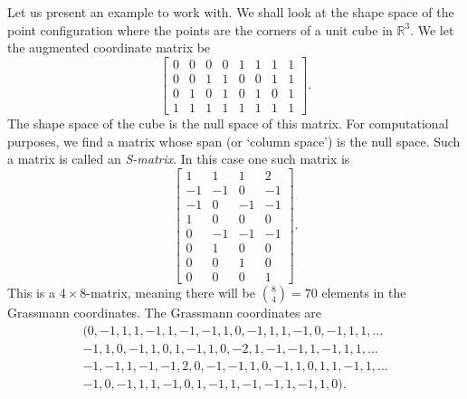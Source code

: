 \documentclass[a4paper,12pt]{book}
\theoremstyle{plain}
\theoremstyle{definition}
\begin{document}
Let us present an example to work with.
We shall look at the shape space of the point configuration where the
points are the corners of a unit cube in \( \mathbb{R}^3 \).
We let the augmented coordinate matrix be
\[
\begin{bmatrix}
	0 & 0 & 0 & 0 & 1 & 1 & 1 & 1 \\
	0 & 0 & 1 & 1 & 0 & 0 & 1 & 1 \\
	0 & 1 & 0 & 1 & 0 & 1 & 0 & 1 \\
	1 & 1 & 1 & 1 & 1 & 1 & 1 & 1
\end{bmatrix}.
\]
The shape space of the cube is the null space of this matrix. For computational purposes, we
find a matrix whose span (or `column space') is the null space. Such a matrix is called an
\emph{S-matrix}. In this case one such matrix is
\[
\begin{bmatrix}
	 1 & 1 & 1 & 2 \\
	-1 &-1 & 0 &-1 \\
	-1 & 0 &-1 &-1 \\
	 1 & 0 & 0 & 0 \\
	 0 &-1 &-1 &-1 \\
	 0 & 1 & 0 & 0 \\
	 0 & 0 & 1 & 0 \\
	 0 & 0 & 0 & 1
\end{bmatrix}.
\]
This is a \( 4 \times 8 \)-matrix, meaning there will be \( {8 \choose 4} = 70 \)
elements in the Grassmann coordinates. The Grassmann coordinates are
\begin{align*}
 &(0, -1,  1,  1, -1,  1, -1, -1,  1,  0, -1,  1,  1, -1,  0, -1,  1,  1, \ldots & \\
 &-1,  1,  0, -1,  1,  0,  1, -1,  1,  0, -2,  1, -1, -1,  1, -1,  1,  1, \ldots & \\
 &-1, -1,  1, -1, -1,  2,  0, -1, -1,  1,  0, -1,  1,  0,  1,  1, -1,  1, \ldots & \\
 & -1,  0, -1,  1,  1, -1,  0,  1, -1,  1, -1, -1,  1, -1,  1,  0) .&
\end{align*}

\begin{figure}
\begin{center}
\end{center}
\end{figure}
\end{document}
